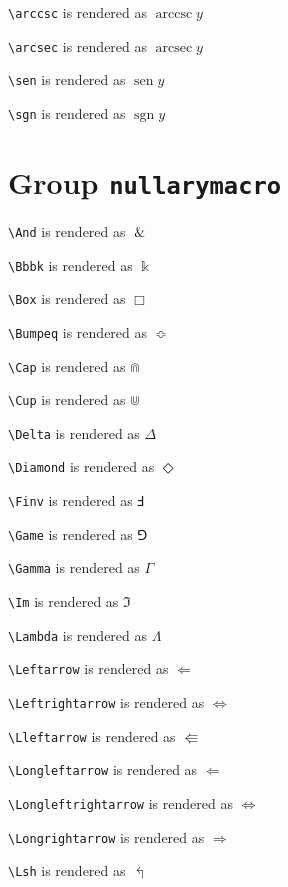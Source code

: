 \texttt{\textbackslash arccsc} is rendered as $\operatorname{arccsc} y$

\texttt{\textbackslash arcsec} is rendered as $\operatorname{arcsec} y$

\texttt{\textbackslash sen} is rendered as $\operatorname{sen} y$

\texttt{\textbackslash sgn} is rendered as $\operatorname{sgn} y$

\section{ Group \texttt{nullary\textunderscore macro}}

\texttt{\textbackslash And} is rendered as $\And$

\texttt{\textbackslash Bbbk} is rendered as $\Bbbk$

\texttt{\textbackslash Box} is rendered as $\Box$

\texttt{\textbackslash Bumpeq} is rendered as $\Bumpeq$

\texttt{\textbackslash Cap} is rendered as $\Cap$

\texttt{\textbackslash Cup} is rendered as $\Cup$

\texttt{\textbackslash Delta} is rendered as $\Delta$

\texttt{\textbackslash Diamond} is rendered as $\Diamond$

\texttt{\textbackslash Finv} is rendered as $\Finv$

\texttt{\textbackslash Game} is rendered as $\Game$

\texttt{\textbackslash Gamma} is rendered as $\Gamma$

\texttt{\textbackslash Im} is rendered as $\Im$

\texttt{\textbackslash Lambda} is rendered as $\Lambda$

\texttt{\textbackslash Leftarrow} is rendered as $\Leftarrow$

\texttt{\textbackslash Leftrightarrow} is rendered as $\Leftrightarrow$

\texttt{\textbackslash Lleftarrow} is rendered as $\Lleftarrow$

\texttt{\textbackslash Longleftarrow} is rendered as $\Longleftarrow$

\texttt{\textbackslash Longleftrightarrow} is rendered as $\Longleftrightarrow$

\texttt{\textbackslash Longrightarrow} is rendered as $\Longrightarrow$

\texttt{\textbackslash Lsh} is rendered as $\Lsh$

